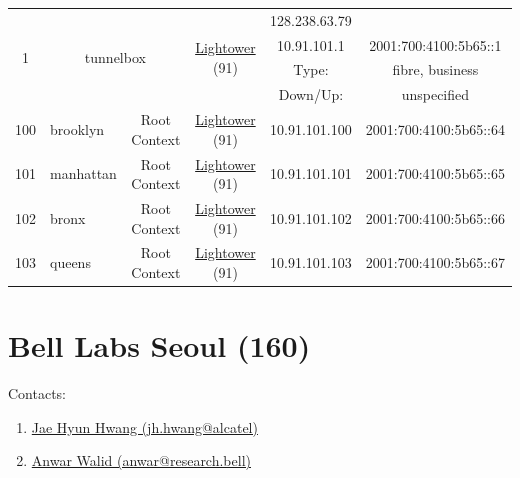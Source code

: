 \begin{small}
\begin{center}
\begin{longtable}{|c|c|c|c|c|c|c|c|}
\endhead
 \multirow{4}{*}{\tiny{1}} & \multicolumn{3}{|c|}{\multirow{4}{*}{\tiny{tunnelbox}}} & \multicolumn{2}{|c|}{\multirow{4}{*}{\tiny{\href{http://www.lightower.com}{Lightower} (91)}}} & \tiny{128.238.63.79} & \frownie{} \\* \cline{7-7}\cline{8-8}
  & \multicolumn{3}{|c|}{} & \multicolumn{2}{|c|}{} & \tiny{10.91.101.1} & \tiny{2001:700:4100:5b65::1} \\* \cline{7-7}\cline{8-8}
  & \multicolumn{3}{|c|}{} & \multicolumn{2}{|c|}{} & Type: & fibre, business \\* \cline{7-7}\cline{8-8}
  & \multicolumn{3}{|c|}{} & \multicolumn{2}{|c|}{} & Down/Up:  & unspecified \\ \hline
 \tiny{100} & \multicolumn{1}{|l|}{\tiny{brooklyn}} & \multicolumn{2}{|c|}{\tiny{Root Context}} & \multicolumn{2}{|c|}{\tiny{\href{http://www.lightower.com}{Lightower} (91)}} & \tiny{10.91.101.100} & \tiny{2001:700:4100:5b65::64} \\ \hline
 \tiny{101} & \multicolumn{1}{|l|}{\tiny{manhattan}} & \multicolumn{2}{|c|}{\tiny{Root Context}} & \multicolumn{2}{|c|}{\tiny{\href{http://www.lightower.com}{Lightower} (91)}} & \tiny{10.91.101.101} & \tiny{2001:700:4100:5b65::65} \\ \hline
 \tiny{102} & \multicolumn{1}{|l|}{\tiny{bronx}} & \multicolumn{2}{|c|}{\tiny{Root Context}} & \multicolumn{2}{|c|}{\tiny{\href{http://www.lightower.com}{Lightower} (91)}} & \tiny{10.91.101.102} & \tiny{2001:700:4100:5b65::66} \\ \hline
 \tiny{103} & \multicolumn{1}{|l|}{\tiny{queens}} & \multicolumn{2}{|c|}{\tiny{Root Context}} & \multicolumn{2}{|c|}{\tiny{\href{http://www.lightower.com}{Lightower} (91)}} & \tiny{10.91.101.103} & \tiny{2001:700:4100:5b65::67} \\ \hline
\end{longtable}
\end{center}
\end{small}



\section{Bell Labs Seoul (160)}
\label{sec:BLS}

Contacts:
\begin{enumerate}
 \item {}\href{mailto:jh.hwang@alcatel}{Jae Hyun Hwang (jh.hwang@alcatel)}
 \item {}\href{mailto:anwar@research.bell}{Anwar Walid (anwar@research.bell)}
\end{enumerate}

